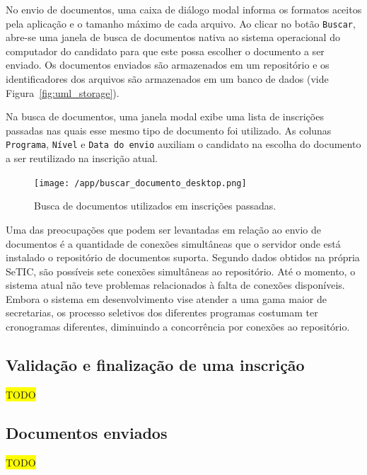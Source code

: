 \documentclass[
  10.5pt,				  %
	openright,			%
	twoside,			  %
  a5paper,
  chapter=TITLE,	%
	section=TITLE,	%
  hyphens,        %
	english,        %
	brazil          %
]{abntex2}
\begin{document}
No envio de documentos, uma caixa de diálogo modal informa os formatos aceitos pela aplicação e o tamanho máximo de cada arquivo. Ao clicar no botão \texttt{Buscar}, abre-se uma janela de busca de documentos nativa ao sistema operacional do computador do candidato para que este possa escolher o documento a ser enviado. Os documentos enviados são armazenados em um repositório e os identificadores dos arquivos são armazenados em um banco de dados (vide Figura~\ref{fig:uml_storage}).

Na busca de documentos, uma janela modal exibe uma lista de inscrições passadas nas quais esse mesmo tipo de documento foi utilizado. As colunas \texttt{Programa}, \texttt{Nível} e \texttt{Data do envio} auxiliam o candidato na escolha do documento a ser reutilizado na inscrição atual.

\begin{figure}[!ht]
  \caption{\label{fig:buscar_documento_desktop} Busca de documentos utilizados em inscrições passadas.}
  \begin{center}
    \texttt{[image: /app/buscar\_documento\_desktop.png]}
  \end{center}
\end{figure}


Uma das preocupações que podem ser levantadas em relação ao envio de documentos é a quantidade de conexões simultâneas que o servidor onde está instalado o repositório de documentos suporta. Segundo dados obtidos na própria SeTIC, são possíveis sete conexões simultâneas ao repositório. Até o momento, o sistema atual não teve problemas relacionados à falta de conexões disponíveis. Embora o sistema em desenvolvimento vise atender a uma gama maior de secretarias, os processo seletivos dos diferentes programas costumam ter cronogramas diferentes, diminuindo a concorrência por conexões ao repositório.


\subsection{Validação e finalização de uma inscrição}\label{sec:validacao}

\colorbox{yellow}{TODO}


\subsection{Documentos enviados}\label{sec:documentos_enviados}

\colorbox{yellow}{TODO}
\end{document}
